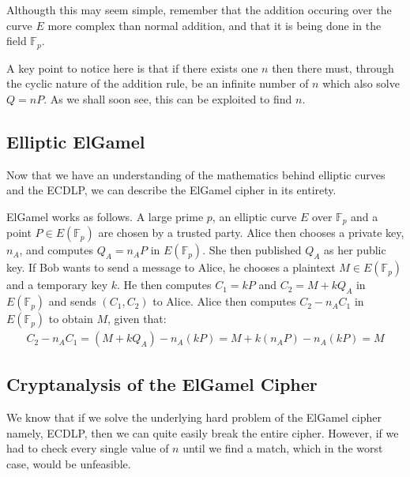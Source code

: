 \documentclass[12pt, a4paper, draft]{report}
\begin{document}
Althougth this may seem simple, remember that the addition occuring over the
curve $E$ more complex than normal addition, and that it is being done in the
field $\mathds{F}_p$.

A key point to notice here is that if there exists one $n$ then there must,
through the cyclic nature of the addition rule, be an infinite number of
$n$ which also solve $Q = nP$. As we shall soon see, this can be exploited
to find $n$.

\subsection{Elliptic ElGamel}

Now that we have an understanding of the mathematics behind elliptic curves and
the ECDLP, we can describe the ElGamel cipher in its entirety.

ElGamel works as follows. A large prime $p$, an elliptic curve $E$ over
$\mathds{F}_p$ and a point $P \in E(\mathds{F}_p)$ are chosen by a trusted
party. Alice then chooses a private key, $n_A$, and computes $Q_A = n_AP$
in $E(\mathds{F}_p)$. She then published $Q_A$ as her public key. If Bob
wants to send a message to Alice, he chooses a plaintext $M \in E(\mathds{F}_p)$
and a temporary key $k$. He then computes $C_1 = kP$ and $C_2 = M + kQ_A$
in $E(\mathds{F}_p)$ and sends $(C_1, C_2)$ to Alice. Alice then computes
$C_2 - n_AC_1$ in $E(\mathds{F}_p)$ to obtain $M$, given that:
\begin{align*}
    C_2 - n_AC_1 = (M + kQ_A) - n_A(kP) = M + k(n_AP) - n_A(kP) = M
\end{align*}

\subsection{Cryptanalysis of the ElGamel Cipher}

We know that if we solve the underlying hard problem of the ElGamel cipher
namely, ECDLP, then we can quite easily break the entire cipher. However,
if we had to check every single value of $n$ until we find a match, which
in the worst case, would be unfeasible.
\end{document}
